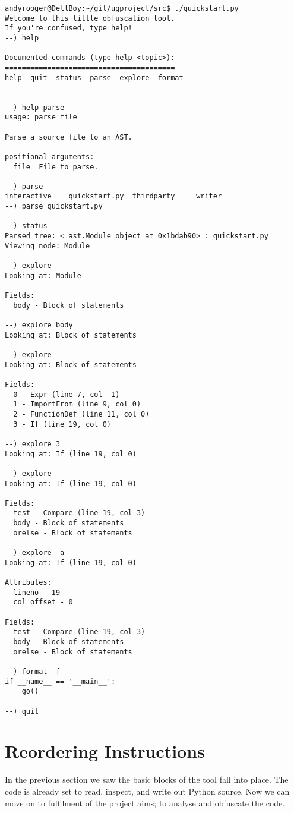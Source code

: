 \documentclass{report}
\begin{document}
\begin{lstlisting}[language=obftool,basicstyle=\small]
andyrooger@DellBoy:~/git/ugproject/src$ ./quickstart.py 
Welcome to this little obfuscation tool.
If you're confused, type help!
--) help

Documented commands (type help <topic>):
========================================
help  quit  status  parse  explore  format


--) help parse
usage: parse file

Parse a source file to an AST.

positional arguments:
  file  File to parse.

--) parse 
interactive    quickstart.py  thirdparty     writer         
--) parse quickstart.py

--) status
Parsed tree: <_ast.Module object at 0x1bdab90> : quickstart.py
Viewing node: Module

--) explore
Looking at: Module

Fields:
  body - Block of statements

--) explore body
Looking at: Block of statements

--) explore
Looking at: Block of statements

Fields:
  0 - Expr (line 7, col -1)
  1 - ImportFrom (line 9, col 0)
  2 - FunctionDef (line 11, col 0)
  3 - If (line 19, col 0)

--) explore 3
Looking at: If (line 19, col 0)

--) explore
Looking at: If (line 19, col 0)

Fields:
  test - Compare (line 19, col 3)
  body - Block of statements
  orelse - Block of statements

--) explore -a
Looking at: If (line 19, col 0)

Attributes:
  lineno - 19
  col_offset - 0

Fields:
  test - Compare (line 19, col 3)
  body - Block of statements
  orelse - Block of statements

--) format -f
if __name__ == '__main__':
    go()

--) quit
\end{lstlisting}

\section{Reordering Instructions}

In the previous section we saw the basic blocks of the tool fall into place. The code
is already set to read, inspect, and write out Python source. Now we can move
on to fulfilment of the project aims; to analyse and obfuscate the code.
\end{document}
